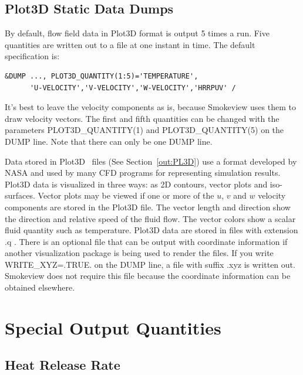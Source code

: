 \documentclass[11pt]{book}
\begin{document}
\subsection{Plot3D Static Data Dumps}%
\label{info:PL3D}

By default, flow field data in Plot3D format is output 5 times a run. Five quantities are written out to a file at one instant in
time. The default specification is:

\footnotesize
\begin{verbatim}
&DUMP ..., PLOT3D_QUANTITY(1:5)='TEMPERATURE',
      'U-VELOCITY','V-VELOCITY','W-VELOCITY','HRRPUV' /
\end{verbatim}
\normalsize

\noindent
It's best to leave the velocity components as is, because Smokeview
uses them to draw velocity vectors. The first and fifth quantities can
be changed with the parameters {\ct PLOT3D\_QUANTITY(1)} and {\ct PLOT3D\_QUANTITY(5)} on the {\ct DUMP} line.
Note that there can only be one {\ct DUMP} line.

Data stored in Plot3D~\cite{PLOT3D} files (See Section~\ref{out:PL3D}) use a format developed by
NASA and used by many CFD programs for representing simulation results.
Plot3D data is visualized in three ways: as 2D contours, vector plots and iso-surfaces.
Vector plots may be viewed if one or more of the $u$, $v$ and $w$
velocity components are stored in the Plot3D file. The vector
length and direction show the direction and relative speed of the
fluid flow. The vector colors show a scalar fluid quantity such as
temperature.
Plot3D data are stored in files with extension {\ct .q} . There is
an optional file that can be output with coordinate information
if another visualization package is being used to render the
files. If you write {\ct WRITE\_XYZ=.TRUE.} on the {\ct DUMP}
line, a file with suffix {\ct .xyz} is written out. Smokeview
does not require this file because the coordinate information can be
obtained elsewhere.


\clearpage

\section{Special Output Quantities}

\subsection{Heat Release Rate}
\label{info:HRR}
\end{document}
